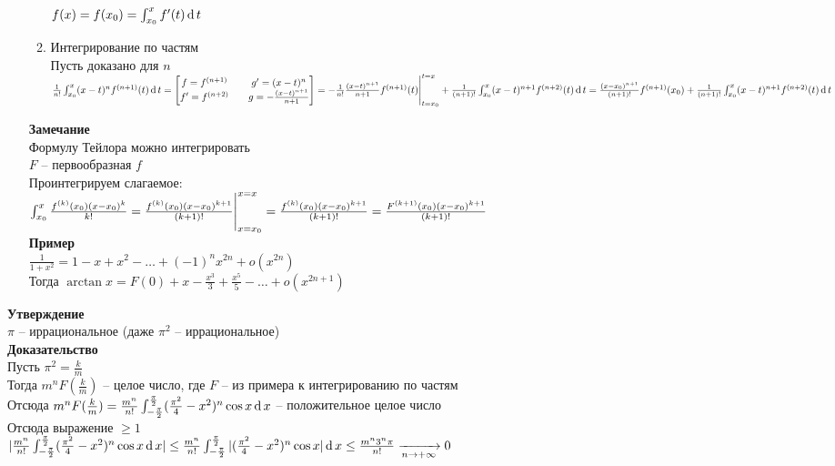 \documentclass[12pt]{article}
\begin{document}
\begin{enumerate}
\begin{enumerate}
        $f(x) = f(x_0) = \int_{x_0}^x f'(t)\operatorname{d} t$
        \item Интегрирование по частям\\
        Пусть доказано для $n$\\
        $\frac1{n!}\int_{x_0}^x (x-t)^n f^{(n+1)}(t)\operatorname{d} t = \begin{bmatrix}
        f = f^{(n+1)} && g' = (x-t)^n\\
        f' = f^{(n+2)} && g = -\frac{(x-t)^{n+1}}{n+1}
        \end{bmatrix} = -\frac1{n!}\frac{(x-t)^{n+1}}{n+1}f^{(n+1)}(t) \Biggr|_{t=x_0}^{t=x} + \frac1{(n+1)!}\int_{x_0}^x (x-t)^{n+1}f^{(n+2)}(t)\operatorname{d} t = \frac{(x-x_0)^{n+1}}{(n+1)!}f^{(n+1)}(x_0) + \frac1{(n+1)!}\int_{x_0}^x (x-t)^{n+1}f^{(n+2)}(t)\operatorname{d} t$
    \end{enumerate}
    \textbf{Замечание}\\
    Формулу Тейлора можно интегрировать\\
    $F$ -- первообразная $f$\\
    Проинтегрируем слагаемое:\\
    $\int_{x_0}^x \frac{f^{(k)}(x_0)(x-x_0)^k}{k!} = \frac{f^{(k)}(x_0)(x-x_0)^{k+1}}{(k+1)!}\Biggr|_{x=x_0}^{x=x} = \frac{f^{(k)}(x_0)(x-x_0)^{k+1}}{(k+1)!} = \frac{F^{(k+1)}(x_0)(x-x_0)^{k+1}}{(k+1)!}$\\
    \textbf{Пример}\\
    $\frac1{1+x^2}=1-x+x^2-\ldots + (-1)^nx^{2n} + o(x^{2n})$\\
    Тогда $\arctan x = F(0) + x - \frac{x^3}{3} + \frac{x^5}{5} - \ldots + o(x^{2n+1})$\\
\end{enumerate}
\textbf{Утверждение}\\
$\pi$ -- иррациональное (даже $\pi^2$ -- иррациональное)\\
\textbf{Доказательство}\\
Пусть $\pi^2 = \frac km$\\
Тогда $m^n F(\frac km)$ -- целое число, где $F$ -- из примера к интегрированию по частям\\
Отсюда $m^n F(\frac km) =  \frac{m^n}{n!}\int_{-\frac\pi2}^{\frac\pi2}(\frac{\pi^2}4 - x^2)^n\cos x \operatorname{d} x$ -- положительное целое число\\
Отсюда выражение $\geq 1$\\
$|\frac{m^n}{n!}\int_{-\frac\pi2}^{\frac\pi2}(\frac{\pi^2}4 - x^2)^n\cos x \operatorname{d} x| \leq \frac{m^n}{n!}\int_{-\frac\pi2}^{\frac\pi2}|(\frac{\pi^2}4 - x^2)^n\cos x| \operatorname{d} x \leq \frac{m^n 3^n \pi}{n!} \xrightarrow[n \rightarrow +\infty]{} 0$\\
\end{document}
